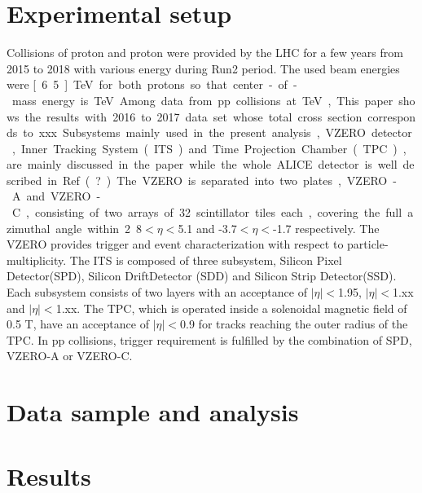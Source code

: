 \documentclass[ALICE,manyauthors]{cernphprep}
\begin{document}
\section{Experimental setup}
Collisions of proton and proton were provided by the LHC for a few years from 2015 to 2018 with various energy during Run2 period. The used beam energies were \unit[6.5]{TeV} for both protons so that center-of-mass energy is \unit[13]{TeV}. Among data from pp collisions at \unit[13]{TeV}, This paper shows the results with 2016 to 2017 data set whose total cross section corresponds to xxx. 
Subsystems mainly used in the present analysis, VZERO detector, Inner Tracking System(ITS) and Time Projection Chamber(TPC), are mainly discussed in the paper while the whole ALICE detector is well described in Ref(?). The VZERO is separated into two plates, VZERO-A and VZERO-C, consisting of two arrays of 32 scintillator tiles each, covering the full azimuthal angle within 2.8$<\eta<$5.1 and -3.7$<\eta<$-1.7 respectively. The VZERO provides trigger and event characterization with respect to particle-multiplicity. The ITS is composed of three subsystem, Silicon Pixel Detector(SPD), Silicon DriftDetector (SDD) and Silicon Strip Detector(SSD). Each subsystem consists of two layers with an acceptance of $|\eta|<$1.95, $|\eta|<$1.xx and $|\eta|<$1.xx. The TPC, which is operated inside a solenoidal magnetic field of 0.5 T, have an acceptance of $|\eta|<$0.9 for tracks reaching the outer radius of the TPC. In pp collisions, trigger requirement is fulfilled by the combination of SPD, VZERO-A or VZERO-C.


 

\section {Data sample and analysis}

\section {Results}
\end{document}
